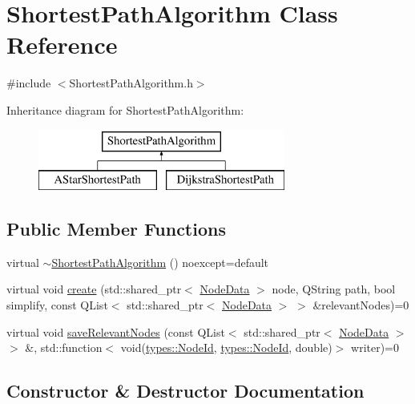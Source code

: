 \hypertarget{class_shortest_path_algorithm}{}\section{Shortest\+Path\+Algorithm Class Reference}
\label{class_shortest_path_algorithm}


{\ttfamily \#include $<$Shortest\+Path\+Algorithm.\+h$>$}

Inheritance diagram for Shortest\+Path\+Algorithm\+:\begin{figure}[H]
\begin{center}
\leavevmode
\includegraphics[height=2.000000cm]{de/d8f/class_shortest_path_algorithm}
\end{center}
\end{figure}
\subsection*{Public Member Functions}
\begin{DoxyCompactItemize}
\item 
virtual \mbox{\hyperlink{class_shortest_path_algorithm_ab5173f082df4af58872831c2f36aaa68}{$\sim$\+Shortest\+Path\+Algorithm}} () noexcept=default
\item 
virtual void \mbox{\hyperlink{class_shortest_path_algorithm_a2d4fc30e24f6bf057111f632ea0633bf}{create}} (std\+::shared\+\_\+ptr$<$ \mbox{\hyperlink{class_node_data}{Node\+Data}} $>$ node, Q\+String path, bool simplify, const Q\+List$<$ std\+::shared\+\_\+ptr$<$ \mbox{\hyperlink{class_node_data}{Node\+Data}} $>$ $>$ \&relevant\+Nodes)=0
\item 
virtual void \mbox{\hyperlink{class_shortest_path_algorithm_ab53826557f9af1fe47d66c32d2f77b79}{save\+Relevant\+Nodes}} (const Q\+List$<$ std\+::shared\+\_\+ptr$<$ \mbox{\hyperlink{class_node_data}{Node\+Data}} $>$ $>$ \&, std\+::function$<$ void(\mbox{\hyperlink{classtypes_1_1_node_id}{types\+::\+Node\+Id}}, \mbox{\hyperlink{classtypes_1_1_node_id}{types\+::\+Node\+Id}}, double)$>$ writer)=0
\end{DoxyCompactItemize}


\subsection{Constructor \& Destructor Documentation}
\mbox{\label{class_shortest_path_algorithm_ab5173f082df4af58872831c2f36aaa68}} 
